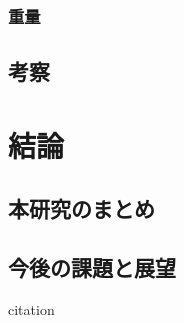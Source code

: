 \subsection{重量}
\section{考察}

\chapter{結論}
\label{chap:conclusion}
\section{本研究のまとめ}
\section{今後の課題と展望}

citation\cite{hoge09}
